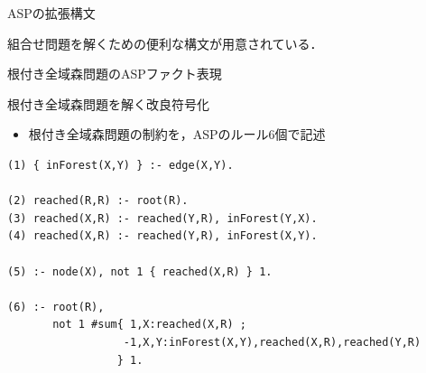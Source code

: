 \documentclass[dvipdfmx,11pt]{beamer}
\newcommand{\code}[1]{\lstinline[basicstyle=\ttfamily]{#1}}
\begin{document}
\begin{frame}{ASPの拡張構文}
\begin{alertblock}{}\centering
  組合せ問題を解くための便利な構文が用意されている．
\end{alertblock}
\end{frame}
\begin{frame}{根付き全域森問題のASPファクト表現}
 \begin{figure}
  \centering
  
 \end{figure}\vfill
  \begin{exampleblock}{}\centering
        
  \end{exampleblock}
\end{frame}
\begin{frame}[fragile]{根付き全域森問題を解く改良符号化}
\begin{itemize}
  \item 根付き全域森問題の制約を，ASPのルール6個で記述
\end{itemize}

\begin{exampleblock}{}\small
\begin{lstlisting}
(1) { inForest(X,Y) } :- edge(X,Y).

(2) reached(R,R) :- root(R).
(3) reached(X,R) :- reached(Y,R), inForest(Y,X).
(4) reached(X,R) :- reached(Y,R), inForest(X,Y).

(5) :- node(X), not 1 { reached(X,R) } 1.

(6) :- root(R),
       not 1 #sum{ 1,X:reached(X,R) ;
                  -1,X,Y:inForest(X,Y),reached(X,R),reached(Y,R)
                 } 1.
\end{lstlisting}
\end{exampleblock}
\end{frame}
\end{document}
